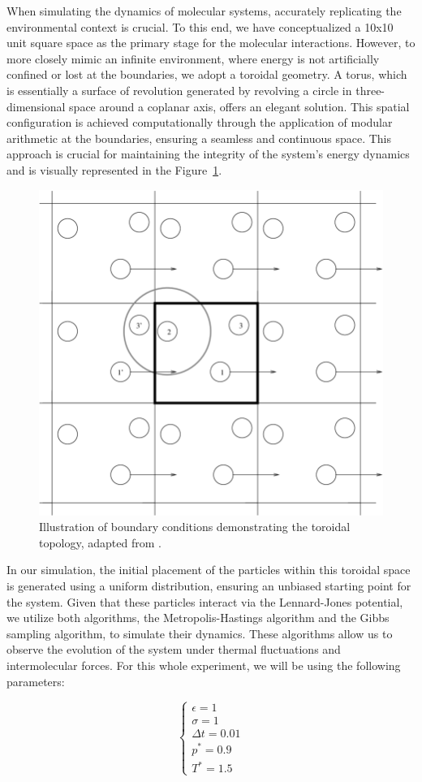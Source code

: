 \documentclass{report}
\begin{document}
When simulating the dynamics of molecular systems, accurately replicating the environmental context is crucial. To this end, we have conceptualized a 10x10 unit square space as the primary stage for the molecular interactions. However, to more closely mimic an infinite environment, where energy is not artificially confined or lost at the boundaries, we adopt a toroidal geometry. A torus, which is essentially a surface of revolution generated by revolving a circle in three-dimensional space around a coplanar axis, offers an elegant solution. This spatial configuration is achieved computationally through the application of modular arithmetic at the boundaries, ensuring a seamless and continuous space. This approach is crucial for maintaining the integrity of the system's energy dynamics and is visually represented in the Figure~\ref{fig:boundaryconditions}.

\begin{figure}[H]
	\centering
	\includegraphics[width=0.5\linewidth]{./Figures/MCMC/LennardJones/boundaryconditions.png}
	\caption{Illustration of boundary conditions demonstrating the toroidal topology, adapted from \cite{hunt2003arnold}.}
	\label{fig:boundaryconditions}
\end{figure}

In our simulation, the initial placement of the particles within this toroidal space is generated using a uniform distribution, ensuring an unbiased starting point for the system. Given that these particles interact via the Lennard-Jones potential, we utilize both algorithms, the Metropolis-Hastings algorithm and the Gibbs sampling algorithm, to simulate their dynamics. These algorithms allow us to observe the evolution of the system under thermal fluctuations and intermolecular forces. For this whole experiment, we will be using the following parameters:

\[
	\begin{cases}
		\epsilon = 1 \\
		\sigma = 1 \\
		\Delta t = 0.01 \\
		p^{*} = 0.9 \\
		T^{*} = 1.5
	\end{cases}
\]
\end{document}
